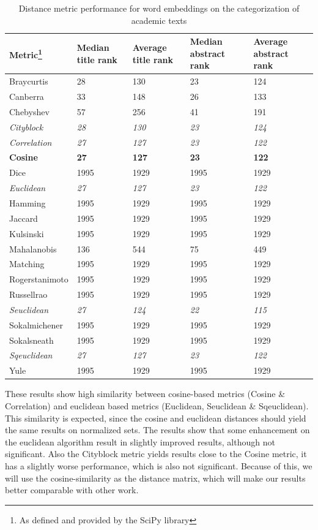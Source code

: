 \documentclass[../../Thesis.tex]{subfiles}
\begin{document}
\begin{table}[hbt]
\begin{tabular}{|l|l|l|l|l|}
\hline
Metric\footnote{As defined and provided by the SciPy library} & Median title rank & Average title rank & Median abstract rank & Average abstract rank  \\
\hline
Braycurtis & 28 & 130 & 23 & 124  \\
\hline
Canberra & 33 & 148 & 26 & 133  \\
\hline
Chebyshev & 57 & 256 & 41 & 191  \\
\hline
\textit{Cityblock} & \textit{28} & \textit{130} & \textit{23} & \textit{124}  \\
\hline
\textit{Correlation} & \textit{27} & \textit{127} & \textit{23} & \textit{122}  \\
\hline
\textbf{Cosine} & \textbf{27} & \textbf{127} & \textbf{23} & \textbf{122}  \\
\hline
Dice & 1995 & 1929 & 1995 & 1929  \\
\hline
\textit{Euclidean} & \textit{27} & \textit{127} & \textit{23} & \textit{122}  \\
\hline
Hamming & 1995 & 1929 & 1995 & 1929  \\
\hline
Jaccard & 1995 & 1929 & 1995 & 1929  \\
\hline
Kulsinski & 1995 & 1929 & 1995 & 1929  \\
\hline
Mahalanobis & 136 & 544 & 75 & 449  \\
\hline
Matching & 1995 & 1929 & 1995 & 1929  \\
\hline
Rogerstanimoto & 1995 & 1929 & 1995 & 1929  \\
\hline
Russellrao & 1995 & 1929 & 1995 & 1929  \\
\hline
\textit{Seuclidean} & \textit{27} & \textit{124} & \textit{22} & \textit{115}  \\
\hline
Sokalmichener & 1995 & 1929 & 1995 & 1929  \\
\hline
Sokalsneath & 1995 & 1929 & 1995 & 1929  \\
\hline
\textit{Sqeuclidean} & \textit{27} & \textit{127} & \textit{23} & \textit{122}  \\
\hline
Yule & 1995 & 1929 & 1995 & 1929  \\
\hline
\end{tabular}
\caption{Distance metric performance for word embeddings on the categorization of academic texts}\label{table:distanceMetrics}
\end{table}
These results show high similarity between cosine-based metrics (Cosine \& Correlation) and euclidean based metrics (Euclidean, Seuclidean \& Sqeuclidean). This similarity is expected, since the cosine and euclidean distances should yield the same results on normalized sets. The results show that some enhancement on the euclidean algorithm result in slightly improved results, although not significant. Also the Cityblock metric yields results close to the Cosine metric, it has a slightly worse performance, which is also not significant. Because of this, we will use the cosine-similarity as the distance matrix, which will make our results better comparable with other work.
\end{document}
